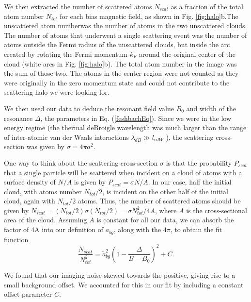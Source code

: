 \documentclass[12pt]{iopart}
\begin{document}
\par We then extracted the number of scattered atoms $N_{scat}$ as a fraction of the total atom number $N_{tot}$ for each bias magnetic field, as shown in Fig. \ref{fig:halo}b.The unscattered atom numberwas the number of atoms in the two unscattered clouds. The number of atoms that underwent a single scattering event was the number of atoms outside the Fermi radius of the unscattered clouds, but inside the arc created by rotating the Fermi momentum $k_F$ around the original center of the cloud (white arcs in Fig. \ref{fig:halo}b). The total atom number in the image was the sum of those two. The atoms in the center region were not counted as they were originally in the zero momentum state and could not contribute to the scattering halo we were looking for. 
\par We then used our data to deduce the resonant field value $B_0$ and width of the resonance  $\Delta$, the parameters in Eq. (\ref{feshbachEq}).  Since we were in the low energy regime (the thermal deBroigle wavelength was much larger than the range of inter-atomic van der Waals interactions $\lambda_{dB}\gg l_{vdW}$ \cite{Williams2012}), the scattering cross-section was given by $\sigma=4\pi a^2$. 
\par One way to think about the scattering cross-section $\sigma$ is that the probability $P_{scat}$ that a single particle will be scattered when incident on a cloud of atoms with a surface density of $N/A$ is given by $P_{scat}=\sigma N/A$. In our case, half the initial cloud, with atoms number $N_{tot}/2$, is incident on the other half of the initial cloud, again with $N_{tot}/2$ atoms. Thus, the number of scattered atoms should be given by $N_{scat}= (N_{tot}/2) \sigma  (N_{tot}/2)=\sigma N_{tot}^2/4A$, where $A$ is the cross-sectional area of the cloud. Assuming $A$ is constant for all our data, we can absorb the factor of 4A into our definition of $a_{bg}$, along with the $4\pi$, to obtain the fit function
\begin{equation}
\frac{N_{scat}}{N_{tot}^2}=\tilde{a}_{bg}^2\left(1-\frac{\Delta}{B-B_0}\right)^2 + C.
\label{eq:fit}
\end{equation}
\par We found that our imaging noise skewed towards the positive, giving rise to a small background offset. We accounted for this in our fit by including a constant offset parameter $C$. 
\end{document}
